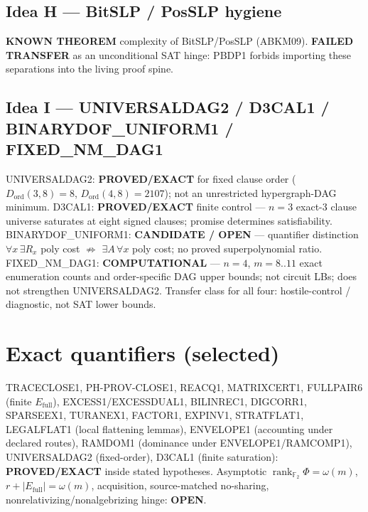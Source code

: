 \documentclass[11pt]{article}
\begin{document}
\subsection*{Idea H --- BitSLP / PosSLP hygiene}
\textbf{KNOWN THEOREM} complexity of BitSLP/PosSLP (ABKM09). \textbf{FAILED
TRANSFER} as an unconditional SAT hinge: PBDP1 forbids importing these separations
into the living proof spine.

\subsection*{Idea I --- UNIVERSALDAG2 / D3CAL1 / BINARYDOF\_UNIFORM1 / FIXED\_NM\_DAG1}
UNIVERSALDAG2: \textbf{PROVED/EXACT} for fixed clause order
($D_{\mathrm{ord}}(3,8)=8$, $D_{\mathrm{ord}}(4,8)=2107$); not an unrestricted
hypergraph-DAG minimum.
D3CAL1: \textbf{PROVED/EXACT} finite control --- $n=3$ exact-3 clause universe
saturates at eight signed clauses; promise determines satisfiability.
BINARYDOF\_UNIFORM1: \textbf{CANDIDATE / OPEN} --- quantifier distinction
$\forall x\,\exists R_x$ poly cost $\not\Rightarrow$ $\exists A\,\forall x$ poly
cost; no proved superpolynomial ratio.
FIXED\_NM\_DAG1: \textbf{COMPUTATIONAL} --- $n{=}4$, $m=8..11$ exact enumeration
counts and order-specific DAG upper bounds; not circuit LBs; does not strengthen
UNIVERSALDAG2.
Transfer class for all four: hostile-control / diagnostic, not SAT lower bounds.

\section*{Exact quantifiers (selected)}
TRACECLOSE1, PH-PROV-CLOSE1, REACQ1, MATRIXCERT1, FULLPAIR6 (finite
$E_{\mathrm{full}}$), EXCESS1/EXCESSDUAL1, BILINREC1, DIGCORR1, SPARSEEX1,
TURANEX1, FACTOR1, EXPINV1, STRATFLAT1, LEGALFLAT1 (local flattening lemmas),
ENVELOPE1 (accounting under declared routes), RAMDOM1 (dominance under
ENVELOPE1/RAMCOMP1), UNIVERSALDAG2 (fixed-order), D3CAL1 (finite saturation):
\textbf{PROVED/EXACT} inside stated hypotheses.
Asymptotic $\operatorname{rank}_{\mathbb F_2}\Phi=\omega(m)$,
$r+|E_{\mathrm{full}}|=\omega(m)$, acquisition, source-matched no-sharing,
nonrelativizing/nonalgebrizing hinge: \textbf{OPEN}.
\end{document}
